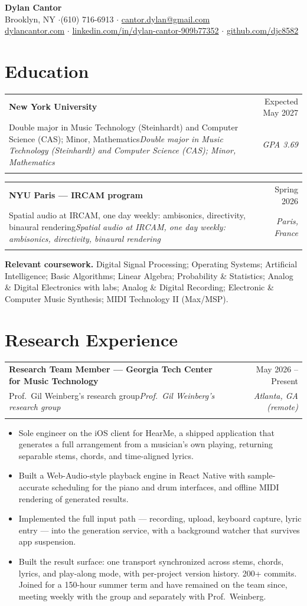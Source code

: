 \documentclass[10pt,letterpaper]{article}
\makeatletter
\newcommand{\entry}[4]{%
  \begin{tabularx}{\textwidth}{@{}X@{\hspace{8pt}}r@{}}
    \textbf{#1} & #2 \\
    \ifx\relax#3\relax\else \textit{#3} & \textit{#4} \\ \fi
  \end{tabularx}\vspace{1pt}}
\makeatother
\begin{document}
\thispagestyle{first}

\begin{center}
  {\LARGE\bfseries Dylan Cantor}\\[5pt]
  Brooklyn, NY \enspace$\cdot$\enspace (610) 716-6913 \enspace$\cdot$\enspace
  \href{mailto:cantor.dylan@gmail.com}{cantor.dylan@gmail.com}\\[2pt]
  \href{https://dylancantor.com}{dylancantor.com} \enspace$\cdot$\enspace
  \href{https://www.linkedin.com/in/dylan-cantor-909b77352/}{linkedin.com/in/dylan-cantor-909b77352} \enspace$\cdot$\enspace
  \href{https://github.com/djc8582}{github.com/djc8582}
\end{center}

\section{Education}
\entry{New York University}{Expected May 2027}
  {Double major in Music Technology (Steinhardt) and Computer Science (CAS); Minor, Mathematics}{GPA 3.69}
\entry{NYU Paris --- IRCAM program}{Spring 2026}
  {Spatial audio at IRCAM, one day weekly: ambisonics, directivity, binaural rendering}{Paris, France}
\textbf{Relevant coursework.} Digital Signal Processing; Operating Systems; Artificial Intelligence; Basic Algorithms;
Linear Algebra; Probability \& Statistics; Analog \& Digital Electronics with labs; Analog \& Digital Recording;
Electronic \& Computer Music Synthesis; MIDI Technology II (Max/MSP).

\section{Research Experience}
\entry{Research Team Member --- Georgia Tech Center for Music Technology}{May 2026 -- Present}
  {Prof.\ Gil Weinberg's research group}{Atlanta, GA (remote)}
\begin{itemize}
  \item Sole engineer on the iOS client for HearMe, a shipped application that generates a full arrangement
  from a musician's own playing, returning separable stems, chords, and time-aligned lyrics.
  \item Built a Web-Audio-style playback engine in React Native with sample-accurate scheduling for the
  piano and drum interfaces, and offline MIDI rendering of generated results.
  \item Implemented the full input path --- recording, upload, keyboard capture, lyric entry --- into the
  generation service, with a background watcher that survives app suspension.
  \item Built the result surface: one transport synchronized across stems, chords, lyrics, and play-along mode,
  with per-project version history. 200+ commits. Joined for a 150-hour summer term and have remained
  on the team since, meeting weekly with the group and separately with Prof.\ Weinberg.
\end{itemize}
\end{document}
